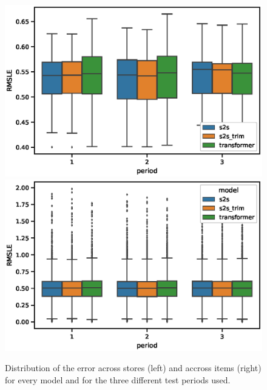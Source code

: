  \begin{figure}[h!]
	\centering
	\includegraphics[width=0.48\linewidth]{salesforecast/images/rmsle_storewise}
	\includegraphics[width=0.48\linewidth]{salesforecast/images/rmsle_itemwise}
	\caption[Error distributions across stores and items]{Distribution of the error across stores (left) and accross items (right) for every model  and for the three different test periods used.}
	\label{fig:stores_items_performance}
\end{figure}

